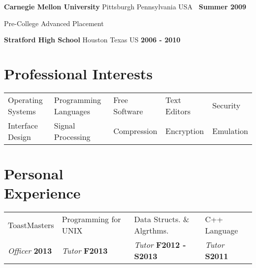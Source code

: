 \documentclass[margin,line]{res}
\newenvironment{list1}{
\begin{list}{\ding{113}}{%
  \setlength{\itemsep}{0in}
  \setlength{\parsep}{0in} \setlength{\parskip}{0in}
  \setlength{\topsep}{0in} \setlength{\partopsep}{0in}
  \setlength{\leftmargin}{0.17in}}}{\end{list}}
\newenvironment{list2}{
\begin{list}{$\bullet$}{%
  \setlength{\itemsep}{0in}
  \setlength{\parsep}{0in} \setlength{\parskip}{0in}
  \setlength{\topsep}{0in} \setlength{\partopsep}{0in}
  \setlength{\leftmargin}{0.2in}}}{\end{list}}
\begin{document}
{\begin{resume}
{\bf Carnegie Mellon University} Pittsburgh Pennsylvania USA \hfill {\bf \ Summer 2009}\\
\vspace*{-.17in}
\begin{list1}
\item[] Pre-College Advanced Placement \hfill\\
  \vspace{-.15in}
\end{list1}

\vspace*{-.165in}
{\bf Stratford High School} Houston Texas US \hfill {\bf 2006 - 2010}\\

\vspace*{-.10in}
{\color{WildStrawberry}
  \section{\sc Professional Interests}}
\hspace{-.14in}
\vspace{-.10in}
\begin{tabular}{l l l l l}
  Operating Systems & Programming Languages & Free Software & Text
  Editors & Security  \\
  Interface Design & Signal Processing& Compression & Encryption & Emulation
\end{tabular}

\vspace*{.25in}
{\color{WildStrawberry}
  \section{\sc Personal \\ Experience}}
\color{black}
\hspace{-.13in}
\begin{tabular}{l l l l}
  ToastMasters & Programming for UNIX & Data Structs. \& Algrthms. & C++ Language \\
  {\em Officer} \bf 2013 & {\em Tutor} \bf F2013 &    {\em Tutor} \bf F2012 - S2013         & {\em Tutor} \bf S2011 \\
\end{tabular}


\end{resume}}
\end{document}
